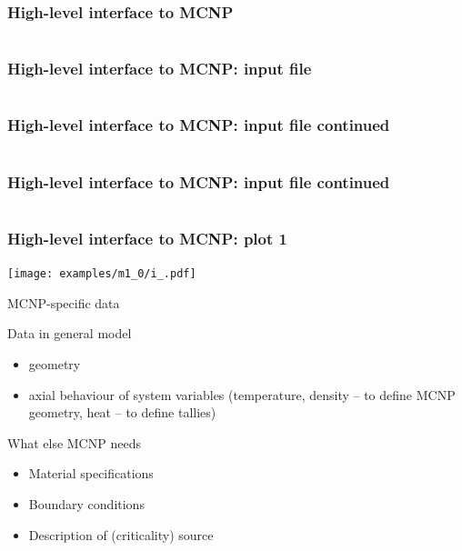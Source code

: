 \begin{frame}[fragile]
    \frametitle{High-level interface to MCNP}
    \inputminted[frame=single,fontfamily=tt,fontsize=\footnotesize]{python}{examples/hmcnp1.py}
\end{frame}

\begin{frame}[fragile]
    \frametitle{High-level interface to MCNP: input file}
    \inputminted[frame=single,fontfamily=tt,fontsize=\footnotesize,lastline=18]{rst}{examples/m1_0/i_}
\end{frame}

\begin{frame}[fragile]
    \frametitle{High-level interface to MCNP: input file continued}
    \inputminted[frame=single,fontfamily=tt,fontsize=\footnotesize,firstline=18,lastline=36]{rst}{examples/m1_0/i_}
\end{frame}

\begin{frame}[fragile]
    \frametitle{High-level interface to MCNP: input file continued}
    \inputminted[frame=single,fontfamily=tt,fontsize=\footnotesize,firstline=36]{rst}{examples/m1_0/i_}
\end{frame}

\begin{frame}\frametitle{High-level interface to MCNP: plot 1}
    \texttt{[image: examples/m1\_0/i\_.pdf]}
\end{frame}

\begin{frame}{MCNP-specific data}

    \begin{block}{Data in general model}
        \begin{itemize}
            \item geometry
            \item axial behaviour of system variables (temperature, density -- to define MCNP geometry, heat -- to define tallies)
        \end{itemize}
    \end{block}

    \begin{block}{What else MCNP needs}
        \begin{itemize}
            \item Material specifications
            \item Boundary conditions
            \item Description of (criticality) source
        \end{itemize}
    \end{block}
\end{frame}


